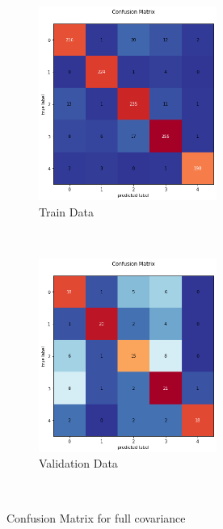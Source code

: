 \newpage
\begin{figure}[!h]
    \centering
    \begin{subfigure}[t]{0.5\textwidth}
        \centering
        \includegraphics[height=2.5in]{Dataset_2a/train1_full.png} 
        \caption{Train Data}
    \end{subfigure}%
    ~ 
    \begin{subfigure}[t]{0.5\textwidth}
        \centering
        \includegraphics[height=2.5in]{Dataset_2a/test1_full.png}
        \caption{Validation Data}
    \end{subfigure}%
    ~
    \caption{Confusion Matrix for full covariance}
    \label{fig:29}
\end{figure}